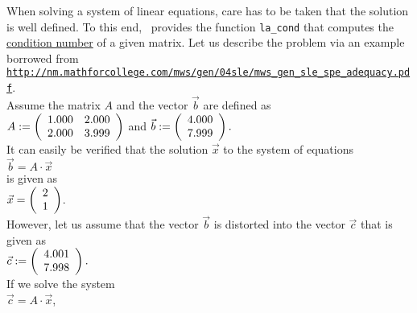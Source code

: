 \noindent
When solving a system of linear equations, care has to be taken that the solution is well defined.
To this end, \setlx\ provides the function \texttt{la\_cond} that computes the 
\href{http://en.wikipedia.org/wiki/Condition_number}{condition number} of a given matrix.
Let us describe the problem via an example borrowed from
\\[0.2cm]
\hspace*{1.3cm}
\href{http://nm.mathforcollege.com/mws/gen/04sle/mws_gen_sle_spe_adequacy.pdf}{\texttt{http://nm.mathforcollege.com/mws/gen/04sle/mws\_gen\_sle\_spe\_adequacy.pdf}}.
\\[0.2cm]
Assume the matrix $A$ and the vector $\vec{b}$ are defined as
\\[0.2cm]
\hspace*{1.3cm}
$A := \left(
  \begin{array}[c]{ll}
    1.000 &  2.000 \\
    2.000 &  3.999
  \end{array}
  \right)
$  \quad and \quad
$\vec{b} := \left(
  \begin{array}[c]{l}
    4.000 \\ 7.999
  \end{array}
  \right).
$
\\[0.2cm]
It can easily be verified that the solution $\vec{x}$ to the system of equations 
\\[0.2cm]
\hspace*{1.3cm}
$\vec{b} = A \cdot \vec{x}$
\\[0.2cm]
is given as
\\[0.2cm]
\hspace*{1.3cm}
$\vec{x}  = 
 \left(
   \begin{array}[c]{l}
     2 \\ 1
   \end{array}
  \right)
$.
\\[0.2cm]
However, let us assume that the vector $\vec{b}$ is distorted into the vector $\vec{c}$ that is
given as
\\[0.2cm]
\hspace*{1.3cm}
$\vec{c} := \left(
  \begin{array}[c]{l}
    4.001 \\ 7.998
  \end{array}
  \right).
$
\\[0.2cm]
If we solve the system
\\[0.2cm]
\hspace*{1.3cm}
$\vec{c} = A \cdot \vec{x}$,
\\[0.2cm]
